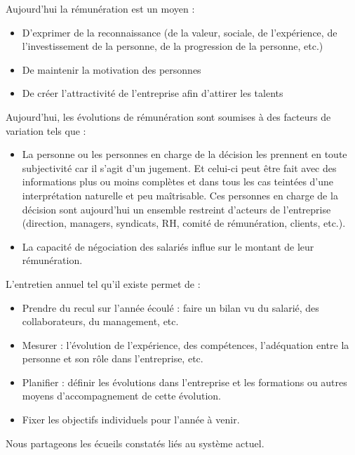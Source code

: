 \documentclass[12pt]{article}
\begin{document}
Aujourd’hui la rémunération est un moyen :
 \begin{itemize}
   \item D’exprimer de la reconnaissance (de la valeur, sociale, de l’expérience, de l’investissement de la personne, de la progression de la personne, etc.)
   \item De maintenir la motivation des personnes
   \item De créer l’attractivité de l’entreprise afin d’attirer les talents
 \end{itemize}

Aujourd’hui, les évolutions de rémunération sont soumises à des facteurs de variation tels que :
 \begin{itemize}
   \item La personne ou les personnes en charge de la décision les prennent en toute subjectivité car il s’agit d’un jugement. Et celui-ci peut être fait avec des informations plus ou moins complètes et dans tous les cas teintées d’une interprétation naturelle et peu maîtrisable. Ces personnes en charge de la décision sont aujourd’hui un ensemble restreint d’acteurs de l’entreprise (direction, managers, syndicats, RH, comité de rémunération, clients, etc.).
   \item La capacité de négociation des salariés influe sur le montant de leur rémunération.
 \end{itemize}

L'entretien annuel tel qu’il existe permet de : 
 \begin{itemize}
   \item Prendre du recul sur l’année écoulé : faire un bilan vu du salarié, des collaborateurs, du management, etc.
   \item Mesurer : l’évolution de l’expérience, des compétences, l’adéquation entre la personne et son rôle dans l’entreprise, etc.
   \item Planifier : définir les évolutions dans l’entreprise et les formations ou autres moyens d'accompagnement de cette évolution.
   \item Fixer les objectifs individuels pour l’année à venir. 
 \end{itemize}

 Nous partageons les écueils constatés liés au système actuel.
\end{document}
